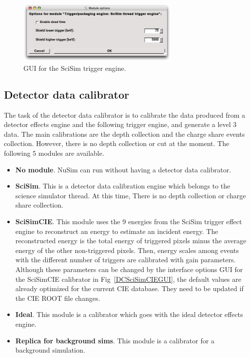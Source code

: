 \begin{figure}[tb]
 \begin{center}
  \includegraphics[width=8cm]{images/TriggerEngineSciSimGUI.png}
  \caption{GUI for the SciSim trigger engine.}
  \label{TESciSimGUI}
 \end{center}
\end{figure}

\subsection{Detector data calibrator}

The task of the detector data calibrator is to calibrate the data
produced from a detector effects engine and the following trigger
engine, and generate a level 3 data.
The main calibrations are the depth collection and the charge share
events collection. However, there is no depth collection or cut at
the moment. The following 5 modules are available.
\begin{itemize}
 \item \textbf{No module}.
       NuSim can run without having a detector data calibrator.
 \item \textbf{SciSim}.
       This is a detector data calibration engine which belongs to
       the science simulator thread. At this time, There is no
       depth collection or charge share collection.
 \item \textbf{SciSimCIE}.
       This module uses the 9 energies from the SciSim trigger effect
       engine to reconstruct an energy to estimate an incident energy.
       The reconstructed energy is the total energy of triggered pixels
       minus the average energy of the other non-triggered pixels.
       Then, energy scales among events with the different number of
       triggers are calibrated with gain parameters. Although these
       parameters can be changed by the interface options GUI for the
       SciSimCIE calibrator in Fig~\ref{DCSciSimCIEGUI}, the default
       values are already optimized for the current CIE database.
       They need to be updated if the CIE ROOT file changes.
 \item \textbf{Ideal}.
       This module is a calibrator which goes with the ideal
       detector effects engine.
 \item \textbf{Replica for background sims}.
       This module is a calibrator for a background simulation.
\end{itemize}

